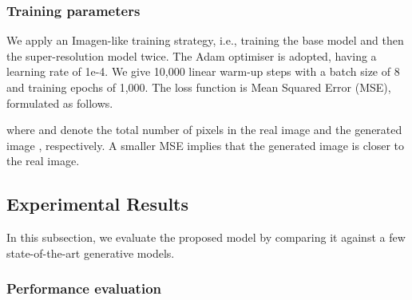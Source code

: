 \documentclass{article}
\begin{document}
\subsubsection{Training parameters }
We apply an Imagen-like training strategy, i.e., training the base model and then the super-resolution model twice. The Adam optimiser is adopted, having a learning rate of 1e-4. We give 10,000 linear warm-up steps with a batch size of 8 and training epochs of 1,000. The loss function is Mean Squared Error (MSE), formulated as follows.


where  and  denote the total number of pixels in the real image  and the generated image , respectively. A smaller MSE implies that the generated image is closer to the real image. 

\subsection{Experimental Results}
In this subsection, we evaluate the proposed model by comparing it against a few state-of-the-art generative models.

\subsubsection{Performance evaluation}
\end{document}
